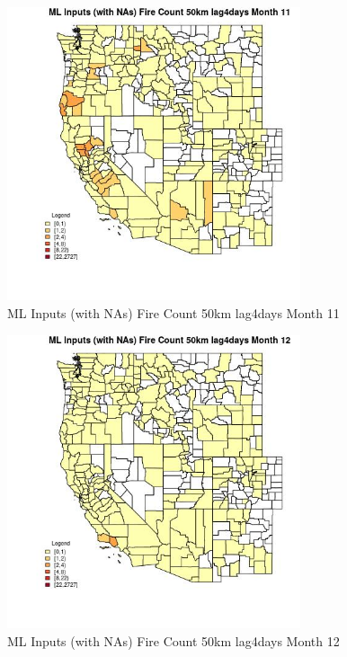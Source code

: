 \begin{figure} 
\centering  
\includegraphics[width=0.77\textwidth]{Code_Outputs/Report_ML_input_PM25_Step4_part_f_de_duplicated_aves_prioritize_24hr_obswNAs_CountyFire_Count_50km_lag4daysmedianMonth11.jpg} 
\caption{\label{fig:Report_ML_input_PM25_Step4_part_f_de_duplicated_aves_prioritize_24hr_obswNAsCountyFire_Count_50km_lag4daysmedianMonth11}ML Inputs (with NAs) Fire Count 50km lag4days Month 11} 
\end{figure} 
 

\begin{figure} 
\centering  
\includegraphics[width=0.77\textwidth]{Code_Outputs/Report_ML_input_PM25_Step4_part_f_de_duplicated_aves_prioritize_24hr_obswNAs_CountyFire_Count_50km_lag4daysmedianMonth12.jpg} 
\caption{\label{fig:Report_ML_input_PM25_Step4_part_f_de_duplicated_aves_prioritize_24hr_obswNAsCountyFire_Count_50km_lag4daysmedianMonth12}ML Inputs (with NAs) Fire Count 50km lag4days Month 12} 
\end{figure} 
 


